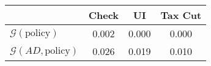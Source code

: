 \begin{tabular}{@{}lccc@{}}
\toprule
                          & Check      & UI    & Tax Cut    \\  \midrule
$\mathcal{G}(\text{policy})$ & 0.002  & 0.000  & 0.000     \\
$\mathcal{G}(AD,\text{policy})$ & 0.026  & 0.019  & 0.010     \\
\end{tabular}
